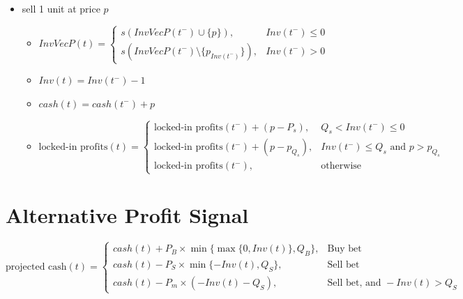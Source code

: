 \documentclass{article}
\begin{document}
\begin{itemize}
\begin{itemize}
        \item $cash(t) = cash(t^-) - p$
        \item $\text{locked-in profits}(t) = 
        \begin{cases} 
            \text{locked-in profits}(t^-) - (p_{Inv(t^-)} - P_s),  & Q_s \leq Inv(t^-) \leq 0, \\  %
            \text{locked-in profits}(t^-), & \text{otherwise}
        \end{cases}$
    \end{itemize}
    \item sell 1 unit at price $p$ 
    \begin{itemize}
        \item $InvVecP(t) =
                 \begin{cases}
                     s(InvVecP(t^-) \cup \{p\}), & Inv(t^-) \leq 0 \\
                     s(InvVecP(t^-) \setminus \{p_{Inv(t^-)}\}), & Inv(t^-) > 0
                 \end{cases}$
        \item $Inv(t) = Inv(t^-) - 1$
        \item $cash(t) = cash(t^-) + p$
        \item $\text{locked-in profits}(t) = 
        \begin{cases} 
            \text{locked-in profits}(t^-) + (p - P_s),  & Q_s < Inv(t^-) \leq 0 \\
            \text{locked-in profits}(t^-) + (p - p_{Q_s}), & Inv(t^-) \leq Q_s \text{ and } p > p_{Q_s} \\
            \text{locked-in profits}(t^-), & \text{otherwise} 
        \end{cases}$
    \end{itemize}
\end{itemize}

\section{Alternative Profit Signal}
$$\text{projected cash}(t) = \begin{cases}
    cash(t) + P_B \times \min\{\max\{0, Inv(t)\}, Q_B\}, & \text{Buy bet} \\
    cash(t) - P_S \times \min\{-Inv(t), Q_S\}, & \text{Sell bet} \\
    cash(t) - P_m \times (-Inv(t) - Q_S), & \text{Sell bet, and } -Inv(t) > Q_S
\end{cases}$$
\end{document}
